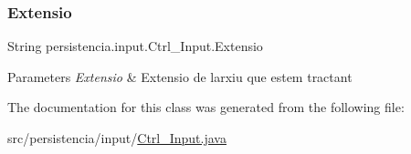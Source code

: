 \subsubsection{\texorpdfstring{Extensio}{Extensio}}
{\footnotesize\ttfamily String persistencia.\+input.\+Ctrl\+\_\+\+Input.\+Extensio\hspace{0.3cm}{\ttfamily [package]}}


\begin{DoxyParams}{Parameters}
{\em Extensio} & Extensio de l\textquotesingle{}arxiu que estem tractant \\
\hline
\end{DoxyParams}


The documentation for this class was generated from the following file\+:\begin{DoxyCompactItemize}
\item 
src/persistencia/input/\hyperlink{Ctrl__Input_8java}{Ctrl\+\_\+\+Input.\+java}\end{DoxyCompactItemize}
